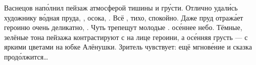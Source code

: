 Васнецов нап\'{о}лнил  пейзаж атмосферой тишины и гр\'{у}сти.
Отлично удал\'{и}сь художнику в\'{о}дная  пруда, , осока, .
Всё , тихо, спокойно.
Даже пруд отраж\'{а}ет героиню очень деликатно, .
Чуть трепещут молодые .   ос\'{е}ннее небо.
Тёмные, зелёные тона пейзажа контрастируют с  на лице героини, а ос\'{е}нняя грусть --- с яркими цветами на юбке Алёнушки. Зритель чувствует: ещё мгнов\'{е}ние и сказка прод\'{о}лжится\dots




